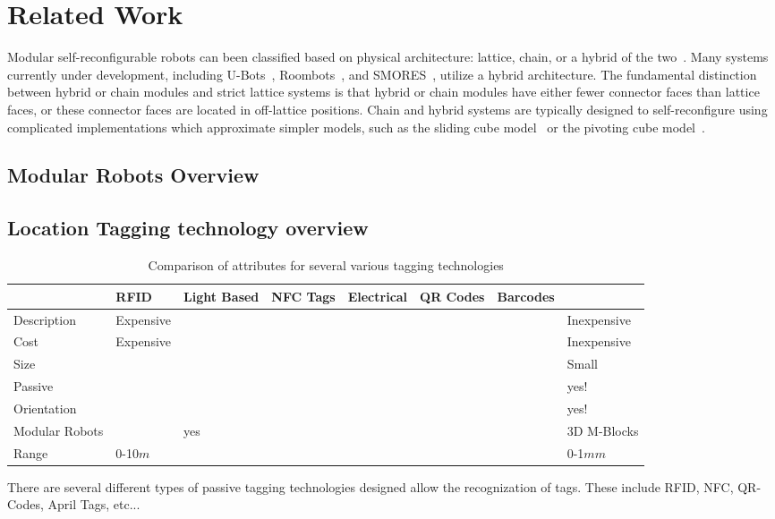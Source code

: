 \section{Related Work}
\label{sec:RelatedWork}

Modular self-reconfigurable robots can been classified based on physical architecture: lattice, chain, or a hybrid of the two~\cite{Yim-RAM07}\cite{Moubarak2012}\cite{surveyyim}.  Many systems currently under development, including U-Bots~\cite{ubot}, Roombots~\cite{roombots3}, and SMORES~\cite{Yim-RAM07}, utilize a hybrid architecture. The fundamental distinction between hybrid or chain modules and strict lattice systems is that hybrid or chain modules have either fewer connector faces than lattice faces, or these connector faces are located in off-lattice positions.  Chain and hybrid systems are typically designed to self-reconfigure using complicated implementations which approximate simpler models, such as the sliding cube model~\cite{FitchRus-IROS03} or the pivoting cube model~\cite{RomanishinRus-IROS13}.

\subsection{Modular Robots Overview}

\subsection{Location Tagging technology overview}

\begin{table*}[ht]
	\centering
	\caption{Comparison of attributes for several various tagging technologies}
	\newcommand{\wdd}{1.8cm}
	\begin{tabular}{ p{\wdd} |p{\wdd}  p{\wdd} p{\wdd} p{\wdd} p{\wdd} p{\wdd} p{\wdd}  }
		\hline
		& RFID 				%
		& Light Based		%
		& NFC Tags 			%
		& Electrical 		%
		& QR Codes 			%
		& Barcodes			%
		& \tagNamePlural \\ %
		\hline
		Description		& Expensive	& 			& 		& 		& 		& 	  	& Inexpensive \\
		Cost			& Expensive	& 			& 		& 		& 		& 	  	& Inexpensive \\
		Size 			&  			& 			&    	&   	&       &     	& Small		  \\
		Passive 		&  			&			&  		&	 	&		& 		& yes!		  \\
		Orientation 	&  			& 			&  		&	 	&	  	& 		& yes!		\\
		Modular Robots 	&  			& yes		&	  	&		&		& 		& 3D M-Blocks\\
		Range			& 0-10$m$	&			&		&		&		&		& 0-1$mm$	\\
	\end{tabular}
	\label{tab:tagTech}    
\end{table*}

There are several different types of passive tagging technologies designed allow the recognization of tags. These include RFID, NFC, QR-Codes, April Tags, etc... 


